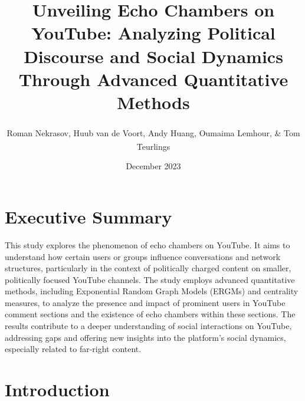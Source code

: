 \documentclass[
  man,floatsintext]{apa6}
\title{Unveiling Echo Chambers on YouTube: Analyzing Political Discourse and Social Dynamics Through Advanced Quantitative Methods}
\author{Roman Nekrasov\textsuperscript{}, Huub van de Voort\textsuperscript{}, Andy Huang\textsuperscript{}, Oumaima Lemhour\textsuperscript{}, \& Tom Teurlings\textsuperscript{}}
\date{December 2023}
\affiliation{\vspace{0.5cm}\textsuperscript{} Jheronimus Academy of Data Science}
\begin{document}
\maketitle

\section*{Executive Summary}\label{executive-summary}

This study explores the phenomenon of echo chambers on YouTube. It aims to understand how certain users or groups influence conversations and network structures, particularly in the context of politically charged content on smaller, politically focused YouTube channels. The study employs advanced quantitative methods, including Exponential Random Graph Models (ERGMs) and centrality measures, to analyze the presence and impact of prominent users in YouTube comment sections and the existence of echo chambers within these sections. The results contribute to a deeper understanding of social interactions on YouTube, addressing gaps and offering new insights into the platform's social dynamics, especially related to far-right content.

\section{Introduction}\label{introduction}
\end{document}
